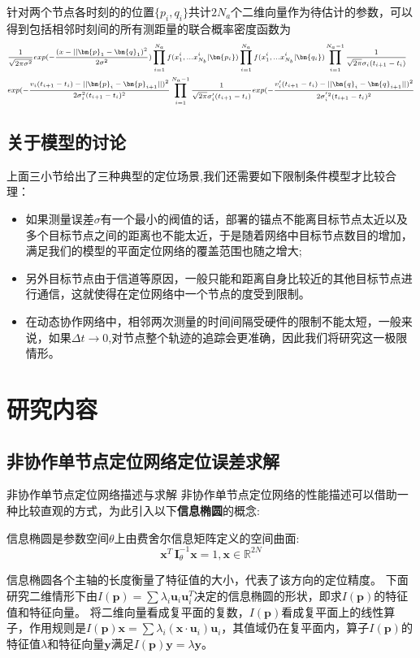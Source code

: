 针对两个节点各时刻的的位置$\{p_i,q_i\}$共计$2N_a$个二维向量作为待估计的参数，可以得到包括相邻时刻间的所有测距量的联合概率密度函数为
\begin{equation}
\scriptsize{
\begin{split}
&\frac{1}{\sqrt{2\pi\sigma^2}}exp(-\frac{(x-||\bm{p}_1-\bm{q}_1)^2}{2\sigma^2})\prod_{i=1}^{N_a}
f(x^i_1,...x^{i}_{N_b}|\bm{p_i})
\prod_{i=1}^{N_a} f(x^i_1,...x^{i}_{N_b}|\bm{q_i})
\prod_{i=1}^{N_a-1}\frac{1}{\sqrt{2\pi}\sigma_i(t_{i+1}-t_i)}\\
&exp(-\frac{v_i(t_{i+1}-t_i)-||\bm{p}_i-\bm{p}_{i+1}||)^2}{2\sigma_i^2(t_{i+1}-t_i)^2}
\prod_{i=1}^{N_a-1}\frac{1}{\sqrt{2\pi}\sigma'_i(t_{i+1}-t_i)}
exp(-\frac{v'_i(t_{i+1}-t_i)-||\bm{q}_i-\bm{q}_{i+1}||)^2}{2\sigma^{'2}_i(t_{i+1}-t_i)^2}
\end{split}}
\end{equation}
\subsection{关于模型的讨论}\label{subsection:model_discussion}
上面三小节给出了三种典型的定位场景,我们还需要如下限制条件模型才比较合理：
\begin{itemize}
  \item 如果测量误差$\sigma$有一个最小的阀值的话，部署的锚点不能离目标节点太近以及多个目标节点之间的距离也不能太近，于是随着网络中目标节点数目的增加，满足我们的模型的平面定位网络的覆盖范围也随之增大;
  \item 另外目标节点由于信道等原因，一般只能和距离自身比较近的其他目标节点进行通信，这就使得在定位网络中一个节点的度受到限制。
  \item 在动态协作网络中，相邻两次测量的时间间隔受硬件的限制不能太短，一般来说，如果$\Delta t \to 0$,对节点整个轨迹的追踪会更准确，因此我们将研究这一极限情形。
\end{itemize}
\section{研究内容}\label{section:research_content}
\subsection{非协作单节点定位网络定位误差求解}\label{subsection:circle_general}
{非协作单节点定位网络描述与求解}
非协作单节点定位网络的性能描述可以借助一种比较直观的方式，为此引入以下\textbf{信息椭圆}的概念\cite{LimitBound}:
\begin{definition}
信息椭圆是参数空间$\theta$上由费舍尔信息矩阵定义的空间曲面:
\begin{equation}\label{eq:ie}
\bm{x}^T\,\bm{I}_{\theta}^{-1}\bm{x}=1,\bm{x}\in \mathbb{R}^{2N}
\end{equation}
\end{definition}
信息椭圆各个主轴的长度衡量了特征值的大小，代表了该方向的定位精度。
下面研究二维情形下由$I(\bm{p})=\sum \lambda_i \bm{u}_i \bm{u}_i^T$决定的信息椭圆的形状，即求$I(\bm{p})$的特征值和特征向量。
将二维向量看成复平面的复数，$I(\bm{p})$看成复平面上的线性算子，作用规则是$I(\bm{p})\bm{x}=\sum \lambda_i (\bm{x}\cdot\bm{u}_i)\bm{u}_i$，其值域仍在复平面内，算子$I(\bm{p})$的特征值$\lambda$和特征向量$\bm{y}$满足$I(\bm{p})\bm{y}=\lambda \bm{y}$。


